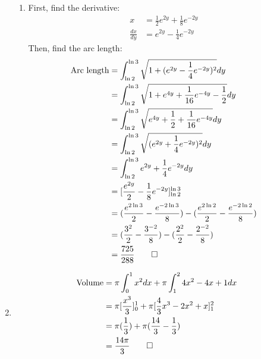 \documentclass[12pt, a4paper]{article}
\begin{document}
\begin{enumerate}[Q\arabic*.]
\begin{enumerate}[(\alph*)]
      \item First, find the derivative:
        \begin{align*}
          x &= \frac{1}{2}e^{2y} + \frac{1}{8}e^{-2y}\\
          \frac{dx}{dy} &= e^{2y} - \frac{1}{4}e^{-2y}
        \end{align*}
        Then, find the arc length:
        \begin{align*}
          \text{Arc length} &= \int^{\ln 3}_{\ln 2} \sqrt{1 + (e^{2y} - \frac{1}{4}e^{-2y})^2} dy\\
                            &= \int^{\ln 3}_{\ln 2} \sqrt{1 + e^{4y} +\frac{1}{16}e^{-4y} - \frac{1}{2}} dy\\
                            &= \int^{\ln 3}_{\ln 2} \sqrt{e^{4y} +\frac{1}{2}+\frac{1}{16}e^{-4y}} dy\\
                            &= \int^{\ln 3}_{\ln 2} \sqrt{(e^{2y} + \frac{1}{4}e^{-2y})^2} dy\\
                            &= \int^{\ln 3}_{\ln 2} e^{2y} + \frac{1}{4}e^{-2y} dy\\
                            &= [\frac{e^{2y}}{2} - \frac{1}{8}e^{-2y}]^{\ln 3}_{\ln 2}\\
                            &= (\frac{e^{2\ln 3}}{2} - \frac{e^{-2\ln 3}}{8}) - (\frac{e^{2\ln 2}}{2} - \frac{e^{-2\ln 2}}{8})\\
                            &= (\frac{3^2}{2} - \frac{3^{-2}}{8}) - (\frac{2^2}{2} - \frac{2^{-2}}{8})\\
                            &= \frac{725}{288} \qed
        \end{align*}
    \end{enumerate}
    \pagebreak
  \item 
    \begin{align*}
      \text{Volume} &= \pi\int^1_0 x^2 dx + \pi\int^2_1 4x^2-4x+1 dx\\
                    &= \pi[\frac{x^3}{3}]^1_0 + \pi[\frac{4}{3}x^3 - 2x^2 + x]^2_1\\
                    &= \pi(\frac{1}{3}) + \pi(\frac{14}{3} - \frac{1}{3})\\
                    &= \frac{14\pi}{3}\qed
    \end{align*}


\end{enumerate}
\end{document}
